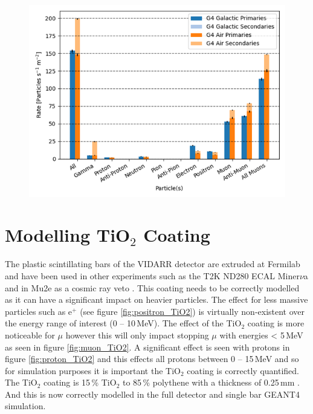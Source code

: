\begin{figure}[htbp]
 \centering
 \includegraphics[width=0.8\linewidth]{Chapter4/Figs/Raster/CryPlots/CRY_rates.png}
 \label{fig:CRY_rates}
\end{figure}

\section{Modelling TiO$_2$ Coating}
The plastic scintillating bars of the VIDARR detector are extruded at Fermilab and have been used in other experiments such as the T2K ND280 ECAL \cite{Allan_2013} Miner$\nu$a \cite{aliaga2014design} and in Mu2e as a cosmic ray veto \cite{Pla-Dalmau2014}. This coating needs to be correctly modelled as it can have a significant impact on heavier particles. The effect for less massive particles such as e$^+$ (see figure \ref{fig:positron_TiO2}) is virtually non-existent over the energy range of interest (0 -- 10\,MeV). The effect of the TiO$_2$ coating is more noticeable for $\mu$ however this will only impact stopping $\mu$ with energies < 5\,MeV as seen in figure \ref{fig:muon_TiO2}. A significant effect is seen with protons in figure \ref{fig:proton_TiO2} and this effects all protons between 0 -- 15\,MeV and so for simulation purposes it is important the TiO$_2$ coating is correctly quantified. The TiO$_2$ coating is 15\,\% TiO$_2$ to 85\,\% polythene \cite{aliaga2014design} \cite{Pla-Dalmau2014} with a thickness of 0.25\,mm \cite{Pla-Dalmau2014}. And this is now correctly modelled in the full detector and single bar GEANT4 simulation.

